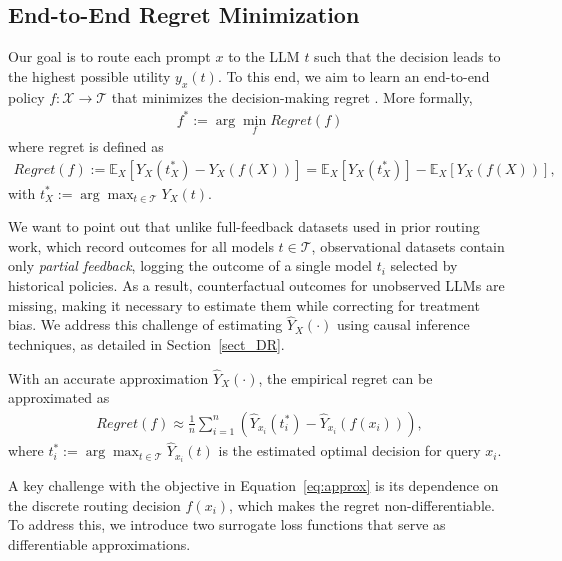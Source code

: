 \documentclass{article}
\theoremstyle{remark}
\begin{document}
\subsection{End-to-End Regret Minimization}\label{sec:smart}

Our goal is to route each prompt $x$ to the LLM $t$ such that the decision leads to the highest possible utility $y_x(t)$. To this end, we aim to learn an end-to-end policy $f: \mathcal{X} \to \mathcal{T}$ that minimizes the decision-making regret \citep{fernandez2022causal,pmlr-v162-zou22a}. More formally,
\begin{align*}
    f^* := \arg \min_f Regret(f)
\end{align*}
\noindent where regret is defined as
\begin{align}
    Regret(f) := \mathbb{E}_X[Y_X(t^*_X) - Y_X(f(X))] = \mathbb{E}_X[Y_X(t^*_X)] - \mathbb{E}_X[Y_X(f(X))],
\end{align}
\noindent with $t^*_X := \arg\max_{t\in\mathcal{T}} Y_X(t)$. 

We want to point out that unlike full-feedback datasets used in prior routing work, which record outcomes for all models $t \in \mathcal{T}$, observational datasets contain only \emph{partial feedback}, logging the outcome of a single model $t_i$ selected by historical policies. As a result, counterfactual outcomes for unobserved LLMs are missing, making it necessary to estimate them while correcting for treatment bias. We address this challenge of estimating $\hat{Y}_X(\cdot)$ using causal inference techniques, as detailed in Section~\ref{sect_DR}.

With an accurate approximation $\hat{Y}_X(\cdot)$,  the empirical regret can be approximated as
\begin{align} Regret(f) \approx \frac{1}{n} \sum_{i=1}^n \left( \hat{Y}_{x_i}(t^*_i) - \hat{Y}_{x_i}(f(x_i)) \right), \label{eq:approx} \end{align} 
\noindent where $t^*_i := \arg\max_{t \in \mathcal{T}} \hat{Y}_{x_i}(t)$ is the estimated optimal decision for query $x_i$. 




A key challenge with the objective in Equation~\eqref{eq:approx} is its dependence on the discrete routing decision $f(x_i)$, which makes the regret non-differentiable. To address this, we introduce two surrogate loss functions that serve as differentiable approximations.
\end{document}
